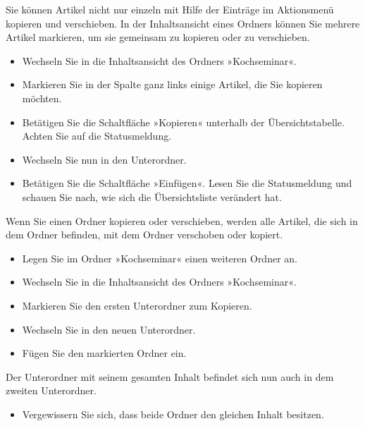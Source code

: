 \documentclass[a4paper,12pt,ngerman]{manual}
\begin{document}
Sie können Artikel nicht nur einzeln mit Hilfe der Einträge im Aktionsmenü
kopieren und verschieben. In der Inhaltsansicht eines Ordners können Sie
mehrere Artikel markieren, um sie gemeinsam zu kopieren oder zu
verschieben.
\begin{itemize}
\item {} 
Wechseln Sie in die Inhaltsansicht des Ordners »Kochseminar«.

\item {} 
Markieren Sie in der Spalte ganz links einige Artikel, die Sie kopieren
möchten.

\item {} 
Betätigen Sie die Schaltfläche »Kopieren« unterhalb der
Übersichtstabelle. Achten Sie auf die Statusmeldung.

\item {} 
Wechseln Sie nun in den Unterordner.

\item {} 
Betätigen Sie die Schaltfläche »Einfügen«. Lesen Sie die Statusmeldung
und schauen Sie nach, wie sich die Übersichtsliste verändert hat.

\end{itemize}

Wenn Sie einen Ordner kopieren oder verschieben, werden alle Artikel, die sich
in dem Ordner befinden, mit dem Ordner verschoben oder kopiert.
\begin{itemize}
\item {} 
Legen Sie im Ordner »Kochseminar« einen weiteren Ordner an.

\item {} 
Wechseln Sie in die Inhaltsansicht des Ordners »Kochseminar«.

\item {} 
Markieren Sie den ersten Unterordner zum Kopieren.

\item {} 
Wechseln Sie in den neuen Unterordner.

\item {} 
Fügen Sie den markierten Ordner ein.

\end{itemize}

Der Unterordner mit seinem gesamten Inhalt befindet sich nun auch in dem
zweiten Unterordner.
\begin{itemize}
\item {} 
Vergewissern Sie sich, dass beide Ordner den gleichen Inhalt besitzen.

\end{itemize}
\end{document}
